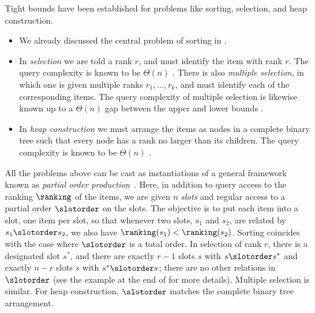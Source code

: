 Tight bounds have been established for problems like sorting, selection, and heap construction. 
\begin{itemize}
 \item We already discussed the central problem of sorting in .
 \item In \emph{selection} we are told a rank $r$, and must identify the item with rank $r$. The query complexity is known to be $\Theta(n)$ \cite{BFPRT1973,DorZwick1995,DorZwick1996}. There is also \emph{multiple selection}, in which one is given multiple ranks $r_1,\dots,r_k$, and must identify each of the corresponding items. 
 The query complexity of multiple selection is likewise known up to a $\Theta(n)$ gap between the upper and lower bounds \cite{KMMS2005}.
 \item In \emph{heap construction} we must arrange the items as nodes in a complete binary tree such that every node has a rank no larger than its children. The query complexity is known to be $\Theta(n)$ \cite{CC92,GM86}. 
\end{itemize}

All the problems above can be cast as instantiations of a general framework known as \emph{partial order production}~\cite{Schoenhage1976}. Here, in addition to query access to the ranking $\ranking$ of the items, we are given $n$ \emph{slots} and regular access to a partial order $\slotorder$ on the slots. The objective is to put each item into a slot, one item per slot, so that whenever two slots, $s_1$ and $s_2$, are related by $s_1 \slotorder s_2$, we also have $\ranking(s_1) < \ranking(s_2)$. Sorting coincides with the case where $\slotorder$ is a total order. In selection of rank $r$, there is a designated slot $s^*$, and there are exactly $r-1$ slots $s$ with $s \slotorder s^*$ and exactly $n-r$ slots $s$ with $s^* \slotorder s$; there are no other relations in $\slotorder$ (see the example at the end of  for more details).  Multiple selection is similar. For heap construction, $\slotorder$ matches the complete binary tree arrangement. 

